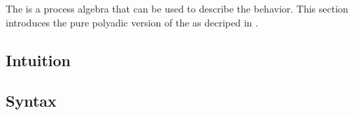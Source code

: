 The \findex[\picalc{}|(]{\picalc{}} is a process algebra that can be used to describe the behavior. This section introduces the pure polyadic version of the \picalc{} as decriped in \cite{milner}. 


\subsection{Intuition}
\label{sec_pi_intuition}


\subsection{Syntax}
\label{sec_pi_syntax}


\newpage %

